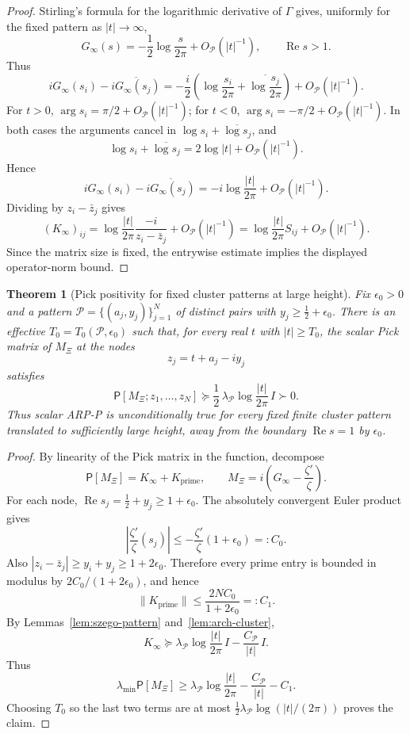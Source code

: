 \documentclass[11pt]{amsart}
\newtheorem{theorem}{Theorem}[section]
\theoremstyle{definition}
\theoremstyle{remark}
\theoremstyle{definition}
\renewcommand{\Re}{\operatorname{Re}}
\newcommand{\half}{\tfrac{1}{2}}
\begin{document}
\begin{proof}
Stirling's formula for the logarithmic derivative of $\Gamma$ gives, uniformly for the fixed pattern
as $|t|\to\infty$,
\[
   G_\infty(s)
   =
   -\frac12\log\frac{s}{2\pi}+O_{\mathcal P}(|t|^{-1}),
   \qquad \Re s>1.
\]
Thus
\[
   iG_\infty(s_i)-\overline{iG_\infty(s_j)}
   =
   -\frac{i}{2}\left(\log\frac{s_i}{2\pi}+
      \overline{\log\frac{s_j}{2\pi}}\right)
   +O_{\mathcal P}(|t|^{-1}).
\]
For $t>0$, $\arg s_i=\pi/2+O_{\mathcal P}(|t|^{-1})$; for $t<0$,
$\arg s_i=-\pi/2+O_{\mathcal P}(|t|^{-1})$.  In both cases the arguments cancel in
$\log s_i+\overline{\log s_j}$, and
\[
   \log s_i+\overline{\log s_j}=2\log|t|+O_{\mathcal P}(|t|^{-1}).
\]
Hence
\[
   iG_\infty(s_i)-\overline{iG_\infty(s_j)}
   =
   -i\log\frac{|t|}{2\pi}+O_{\mathcal P}(|t|^{-1}).
\]
Dividing by $z_i-\bar z_j$ gives
\[
   (K_\infty)_{ij}
   =
   \log\frac{|t|}{2\pi}\frac{-i}{z_i-\bar z_j}
   +O_{\mathcal P}(|t|^{-1})
   =
   \log\frac{|t|}{2\pi}S_{ij}+O_{\mathcal P}(|t|^{-1}).
\]
Since the matrix size is fixed, the entrywise estimate implies the displayed operator-norm bound.
\end{proof}

\begin{theorem}[Pick positivity for fixed cluster patterns at large height]\label{thm:cluster}
Fix $\epsilon_0>0$ and a pattern
$\mathcal P=\{(a_j,y_j)\}_{j=1}^N$ of distinct pairs with
$y_j\ge\half+\epsilon_0$.  There is an effective
$T_0=T_0(\mathcal P,\epsilon_0)$ such that, for every real $t$ with $|t|\ge T_0$, the scalar Pick
matrix of $M_\Xi$ at the nodes
\[
   z_j=t+a_j-iy_j
\]
satisfies
\[
   \mathsf P[M_\Xi;z_1,\ldots,z_N]
   \succeq
   \frac12\,\lambda_{\mathcal P}\log\frac{|t|}{2\pi}\,I
   \succ0.
\]
Thus scalar ARP-P is unconditionally true for every fixed finite cluster pattern translated to
sufficiently large height, away from the boundary $\Re s=1$ by $\epsilon_0$.
\end{theorem}

\begin{proof}
By linearity of the Pick matrix in the function, decompose
\[
   \mathsf P[M_\Xi]=K_\infty+K_{\mathrm{prime}},
   \qquad
   M_\Xi=i\left(G_\infty-\frac{\zeta'}{\zeta}\right).
\]
For each node, $\Re s_j=\half+y_j\ge1+\epsilon_0$.  The absolutely convergent Euler product gives
\[
   \left|\frac{\zeta'}{\zeta}(s_j)\right|
   \le
   -\frac{\zeta'}{\zeta}(1+\epsilon_0)
   =:C_0.
\]
Also $|z_i-\bar z_j|\ge y_i+y_j\ge1+2\epsilon_0$.  Therefore every prime entry is bounded in modulus
by $2C_0/(1+2\epsilon_0)$, and hence
\[
   \|K_{\mathrm{prime}}\|
   \le
   \frac{2NC_0}{1+2\epsilon_0}
   =:C_1.
\]
By Lemmas~\ref{lem:szego-pattern} and~\ref{lem:arch-cluster},
\[
   K_\infty
   \succeq
   \lambda_{\mathcal P}\log\frac{|t|}{2\pi}\,I
   -
   \frac{C_{\mathcal P}}{|t|}\,I.
\]
Thus
\[
   \lambda_{\min}\mathsf P[M_\Xi]
   \ge
   \lambda_{\mathcal P}\log\frac{|t|}{2\pi}
   -
   \frac{C_{\mathcal P}}{|t|}
   -
   C_1.
\]
Choosing $T_0$ so the last two terms are at most
$\frac12\lambda_{\mathcal P}\log(|t|/(2\pi))$ proves the claim.
\end{proof}
\end{document}
